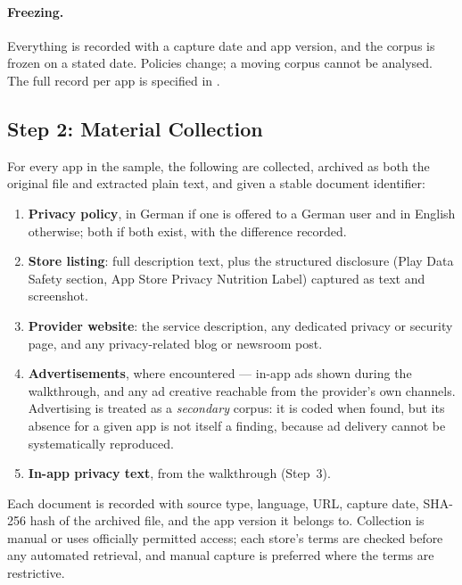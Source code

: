 \paragraph{Freezing.}
Everything is recorded with a capture date and app version, and the corpus is
frozen on a stated date. Policies change; a moving corpus cannot be analysed.
The full record per app is specified in
.

\subsection{Step 2: Material Collection}

For every app in the sample, the following are collected, archived as both the
original file and extracted plain text, and given a stable document identifier:

\begin{enumerate}[leftmargin=*,itemsep=2pt]
  \item \textbf{Privacy policy}, in German if one is offered to a German user and
        in English otherwise; both if both exist, with the difference recorded.
  \item \textbf{Store listing}: full description text, plus the structured
        disclosure (Play Data Safety section, App Store Privacy Nutrition Label)
        captured as text and screenshot.
  \item \textbf{Provider website}: the service description, any dedicated privacy
        or security page, and any privacy-related blog or newsroom post.
  \item \textbf{Advertisements}, where encountered --- in-app ads shown during
        the walkthrough, and any ad creative reachable from the provider's own
        channels. Advertising is treated as a \emph{secondary} corpus: it is
        coded when found, but its absence for a given app is not itself a
        finding, because ad delivery cannot be systematically reproduced.
  \item \textbf{In-app privacy text}, from the walkthrough (Step~3).
\end{enumerate}

Each document is recorded with source type, language, URL, capture date,
SHA-256 hash of the archived file, and the app version it belongs to. Collection
is manual or uses officially permitted access; each store's terms are checked
before any automated retrieval, and manual capture is preferred where the terms
are restrictive.

